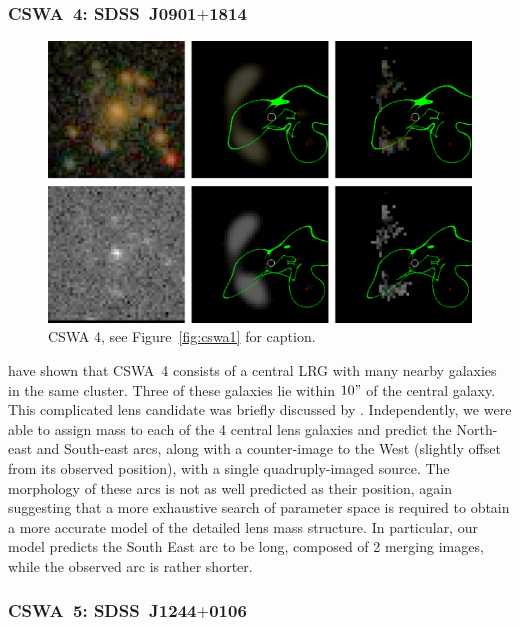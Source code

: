 \documentclass[iop]{emulateapj}
\begin{document}
\subsubsection*{CSWA~4: SDSS\ J0901$+$1814}
\label{sec:results:indinotes:cswa4}


\begin{figure}[!ht]
	\centering\includegraphics[width=\linewidth]{figs/4.eps}
	\caption{CSWA 4, see Figure~\ref{fig:cswa1} for caption.}
	\label{fig:cswa4}
\end{figure}

\citet{Bel++07} have shown that CSWA~4 consists of a central LRG with many
nearby galaxies in the same cluster. Three of these galaxies lie within $10"$ of
the central galaxy. This complicated lens candidate was briefly discussed by
\citet{Die++09}.  Independently, we were able to assign mass to each of the 4
central lens galaxies and predict the North-east and South-east arcs, along with
a counter-image to the West (slightly offset from its observed position),  with
a single quadruply-imaged source.  The morphology of these arcs is not as well
predicted as their position, again suggesting that a more exhaustive search of
parameter space is required to obtain a more  accurate model of the detailed
lens mass structure. In particular, our model predicts the South East arc to be
long, composed of 2 merging images, while  the observed arc is rather shorter. 



\subsubsection*{CSWA~5: SDSS\ J1244$+$0106}
\label{sec:results:indinotes:cswa5}
\end{document}

